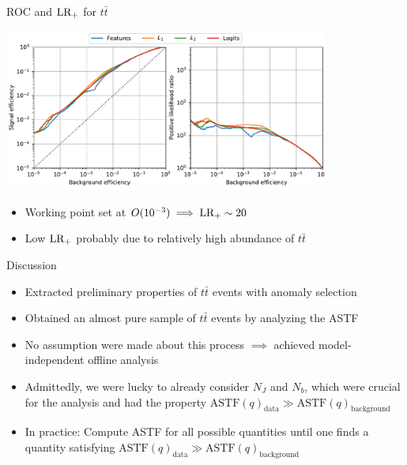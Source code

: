 \documentclass{beamer}
\begin{document}
\begin{frame}{ROC and $\textup{LR}_+$ for $t\bar{t}$}
\begin{center}
\includegraphics[width=0.8\textwidth]{roc-tt.pdf}
\end{center}
\begin{itemize}
    \item<1-> Working point set at $O(10^{-3}) \implies \textup{LR}_+ \sim 20$ 
    \item<2-> Low $\textup{LR}_+$ probably due to relatively high abundance of $t\bar{t}$
\end{itemize}
\end{frame}

\begin{frame}{Discussion}

\begin{itemize}
    \item<1-> Extracted preliminary properties of $t\bar{t}$ events with anomaly selection
    \item<2-> Obtained an almost pure sample of $t\bar{t}$ events by analyzing the ASTF
    \item<3-> No assumption were made about this process $\implies$ achieved model-independent offline analysis
    \item<4-> Admittedly, we were lucky to already consider $N_J$ and $N_b$, which were crucial for the analysis and had the property $\text{ASTF}(q)_{\text{data}} \gg \text{ASTF}(q)_{\text{background}}$
    \item<5-> In practice: Compute ASTF for all possible quantities until one finds a quantity satisfying $\text{ASTF}(q)_{\text{data}} \gg \text{ASTF}(q)_{\text{background}}$
\end{itemize}
\end{frame}
\end{document}
